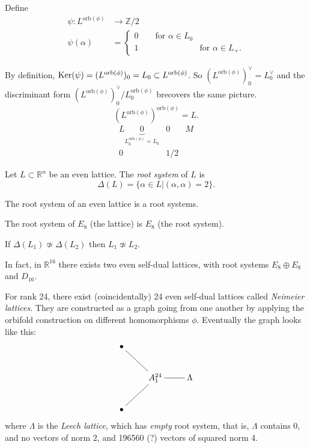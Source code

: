 Define
\begin{align*}
\psi: L^{\text{orb}(\phi)} &\longrightarrow \mathbb{Z}/2 \\
 \psi(\alpha)&=
\begin{cases}
0\qquad \text{for }\alpha \in L_0& \\
1\qquad &\text{for }\alpha \in L_+.
\end{cases}
\end{align*}

\noindent
By definition,
 $\mathop{\mathrm{Ker}}(\psi)=(L^{\text{orb}(\phi)})_0=L_0 \subset L^{\text{orb}(\phi)}$.
So $(L^{\text{orb}(\phi)})_0^\vee=L_0^\vee$
and the discriminant form $(L^{\text{orb}(\phi)})_0^\vee/L^{\text{orb}(\phi)}_0$
brecovers the same picture.
$$
(L^{\text{orb}(\phi)})^{\text{orb}(\phi)}=L.
$$
$$
\begin{matrix}
L
\underbrace{0}_{L^{\text{orb}(\phi)}_0=L_0} & 0 & M\\
0&1/2
\end{matrix}
$$
\begin{definition}
\label{definition-root-system-lattice}
Let $L \subset \mathbb{R}^n$ be an even lattice.
The {\it root system} of $L$ is
$$
\Delta(L)=\{\alpha \in L|(\alpha,\alpha)=2\}.
$$
\end{definition}

\begin{proposition}
\label{proposition-root-systems-lattice-lie-algebras}
The root system of an even lattice is a root systems.
\end{proposition}

\begin{example}
\label{example-e8-root-system}
The root system of $E_8$ (the lattice)
is $E_8$ (the root system).
\end{example}

\noindent
If $\Delta(L_1) \not \simeq \Delta(L_2)$
then $L_1\not\simeq L_2$.

In fact, in $\mathbb{R}^{16}$ there exists 
two even self-dual lattices,
with root systems $E_8 \oplus E_8$ and $D_{16}$.

For rank 24, there exist (coincidentally) 24 even self-dual lattices
called  {\it Neimeier lattices}.
They are constructed as a graph going from one another
by applying the orbifold construction on different homomorphisms $\phi$.
Eventually the graph looks like this:
$$
\xymatrix{
\bullet \ar@{-}[dr]\\
& A_1^{24}\ar@{-}[r]& \Lambda\\
\bullet \ar@{-}[ur]
}
$$
where $\Lambda$ is the {\it Leech lattice}, which has {\it empty} root system,
that is, $\Lambda$ contains $0$, and no vectors of norm $2$,
and 196560 (?) vectors of squared norm 4.

